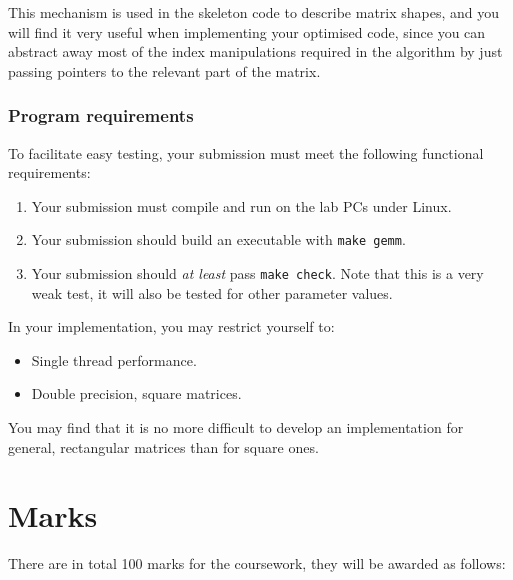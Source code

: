 \documentclass[a4paper]{article}
\begin{document}
This mechanism is used in the skeleton code to describe matrix shapes,
and you will find it very useful when implementing your optimised
code, since you can abstract away most of the index manipulations
required in the algorithm by just passing pointers to the relevant
part of the matrix.

\subsubsection{Program requirements}
\label{sec:requirements-l4}
To facilitate easy testing, your submission must meet the following
functional requirements:
\begin{enumerate}
\item Your submission must compile and run on the lab PCs under Linux.
\item Your submission should build an executable with \texttt{make gemm}.
\item Your submission should \emph{at least} pass \texttt{make check}.
  Note that this is a very weak test, it will also be tested for other
  parameter values.
\end{enumerate}

In your implementation, you may restrict yourself to:
\begin{itemize}
\item Single thread performance.
\item Double precision, square matrices.
\end{itemize}
You may find that it is no more difficult to develop an implementation
for general, rectangular matrices than for square ones.


\section{Marks}
\label{sec:marks}

There are in total 100 marks for the coursework, they
will be awarded as follows:
\end{document}

